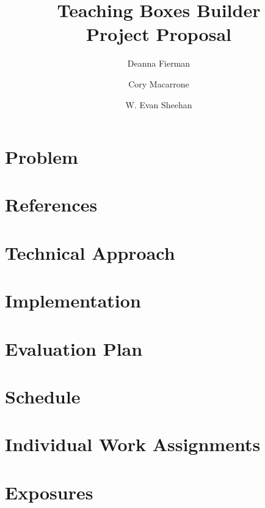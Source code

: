 \documentclass[11pt,letter]{article}
\title{Teaching Boxes Builder\\Project Proposal}
\author{Deanna Fierman \and Cory Macarrone \and W. Evan Sheehan}
\begin{document}
\begin{titlepage}
	\maketitle
	\thispagestyle{empty}
\end{titlepage}

\section{Problem}

\section{References}

\section{Technical Approach}

\section{Implementation}

\section{Evaluation Plan}

\section{Schedule}

\section{Individual Work Assignments}

\section{Exposures}
\end{document}
